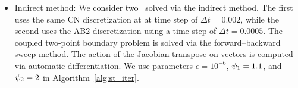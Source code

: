 \begin{itemize}
\begin{itemize}
\item Indirect method: We consider two \methodAcronymROMs\ solved via the indirect method. The first uses the same CN discretization at at time step of $\Delta t = 0.002$, while the second uses the AB2 discretization using a time step of $\Delta t = 0.0005$. The coupled two-point boundary 
problem is solved via the forward--backward sweep method. The action of the Jacobian transpose on vectors is computed via automatic differentiation. We use parameters $\epsilon = 10^{-6}$, $\psi_1 = 1.1$, and $\psi_2=2$ in Algorithm~\ref{alg:st_iter}. 
\end{itemize}
\end{itemize}

%



